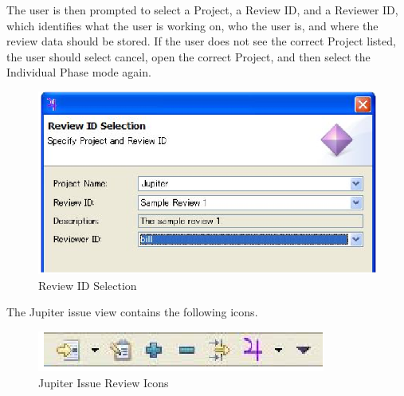 The user is then prompted to select a Project, a Review ID, and a Reviewer ID, which identifies what the user is working on, who the user is, and where the review data should be stored. If the user does not see the correct Project listed, the user should select cancel, open the correct Project, and then select the Individual Phase mode again.

\begin{figure}[htbp]
  \centering
  \includegraphics{images/fig3-15.eps}
  \caption{Review ID Selection}
  \label{fig3-15}
\end{figure}

The Jupiter issue view contains the following icons.

\begin{figure}[htbp]
  \centering
  \includegraphics{images/fig3-16.eps}
  \caption{Jupiter Issue Review Icons}
  \label{fig3-16}
\end{figure}

